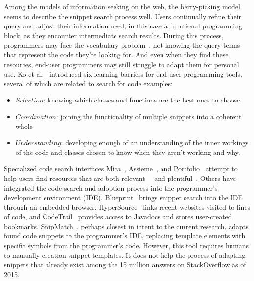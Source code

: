 Among the models of information seeking on the web, the berry-picking model~\cite{Bates-Design} seems to describe the snippet search process well.
Users continually refine their query and adjust their information need, in this case a functional programming block, as they encounter intermediate search results.
During this process, programmers may face the vocabulary problem~\cite{Furnas-Vocabulary}, not knowing the query terms that represent the code they're looking for.
And even when they find these resources, end-user programmers may still struggle to adapt them for personal use.
Ko et al.~\cite{Ko-Six} introduced six learning barriers for end-user programming tools, several of which are related to search for code examples:
\begin{itemize}
\item $Selection$: knowing which classes and functions are the best ones to choose
\item $Coordination$: joining the functionality of multiple snippets into a coherent whole
\item $Understanding$: developing enough of an understanding of the inner workings of the code and classes chosen to know when they aren't working and why.
\end{itemize}

Specialized code search interfaces Mica~\cite{Stylos-Mica}, Assieme~\cite{Hoffman-Assieme}, and Portfolio~\cite{McMillan-Portfolio} attempt to help users find resources that are both relevant~\cite{Stylos-Mica}~\cite{Hoffman-Assieme} and plentiful~\cite{McMillan-Portfolio}.
Others have integrated the code search and adoption process into the programmer's development environment (IDE).
Blueprint~\cite{Brandt-Example} brings snippet search into the IDE through an embedded browser.
HyperSource~\cite{Hartmann-HyperSource} links recent websites visited to lines of code, and CodeTrail~\cite{Goldman-CodeTrail} provides access to Javadocs and stores user-created bookmarks.
SnipMatch~\cite{Wightman-SnipMatch}, perhaps closest in intent to the current research, adapts found code snippets to the programmer's IDE, replacing template elements with specific symbols from the programmer's code.
However, this tool requires humans to manually creation snippet templates.
It does not help the process of adapting snippets that already exist among the 15 million answers on StackOverflow as of 2015.
